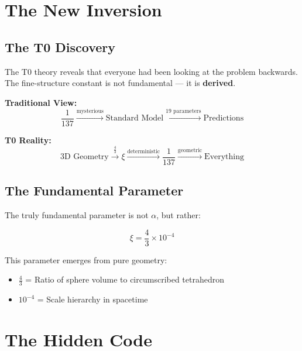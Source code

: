 	\section{The New Inversion}
	
	\subsection{The T0 Discovery}
	
	The T0 theory reveals that everyone had been looking at the problem backwards. The fine-structure constant is not fundamental — it is \textbf{derived}.
	
	\begin{tcolorbox}[colback=green!5!white,colframe=green!50!black,title=The Paradigm Shift]
		\textbf{Traditional View:}
		\begin{equation}
			\frac{1}{137} \xrightarrow{\text{mysterious}} \text{Standard Model} \xrightarrow{\text{19 parameters}} \text{Predictions}
		\end{equation}
		
		\textbf{T0 Reality:}
		\begin{equation}
			\text{3D Geometry} \xrightarrow{\frac{4}{3}} \xi \xrightarrow{\text{deterministic}} \frac{1}{137} \xrightarrow{\text{geometric}} \text{Everything}
		\end{equation}
	\end{tcolorbox}
	
	\subsection{The Fundamental Parameter}
	
	The truly fundamental parameter is not $\alpha$, but rather:
	
	\begin{equation}
		\boxed{\xi = \frac{4}{3} \times 10^{-4}}
	\end{equation}
	
	This parameter emerges from pure geometry:
	\begin{itemize}
		\item $\frac{4}{3}$ = Ratio of sphere volume to circumscribed tetrahedron
		\item $10^{-4}$ = Scale hierarchy in spacetime
	\end{itemize}
	
	\section{The Hidden Code}
	
